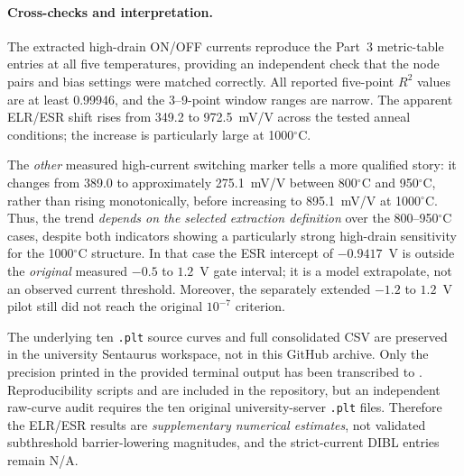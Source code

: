 \paragraph{Cross-checks and interpretation.}
The extracted high-drain ON/OFF currents reproduce the
Part~3 metric-table entries at all five temperatures,
providing an independent check that the node pairs
and bias settings were matched correctly.
All reported five-point $R^2$ values are at least
0.99946, and the 3--9-point window ranges are narrow.
The apparent ELR/ESR shift rises from 349.2 to
972.5~mV/V across the tested anneal conditions;
the increase is particularly large at 1000$^\circ$C.

The \emph{other} measured high-current switching
marker tells a more qualified story: it changes from
389.0 to approximately 275.1~mV/V between
800$^\circ$C and 950$^\circ$C, rather than rising
monotonically, before increasing to 895.1~mV/V
at 1000$^\circ$C. Thus, the trend \emph{depends
on the selected extraction definition} over the
800--950$^\circ$C cases, despite both indicators
showing a particularly strong high-drain sensitivity
for the 1000$^\circ$C structure.
In that case the ESR intercept of $-0.9417$~V
is outside the \emph{original} measured
$-0.5$ to $1.2$~V gate interval; it is a model
extrapolate, not an observed current threshold.
Moreover, the separately extended $-1.2$ to
$1.2$~V pilot still did not reach the
original $10^{-7}$ criterion.

The underlying ten \texttt{.plt} source curves and
full consolidated CSV are preserved in the university
Sentaurus workspace, not in this GitHub archive.
Only the precision printed in the provided terminal
output has been transcribed to
.
Reproducibility scripts
and 
are included in the repository, but an
independent raw-curve audit requires the ten
original university-server \texttt{.plt} files.
Therefore the ELR/ESR results are
\emph{supplementary numerical estimates}, not
validated subthreshold barrier-lowering magnitudes,
and the strict-current DIBL entries remain N/A.
